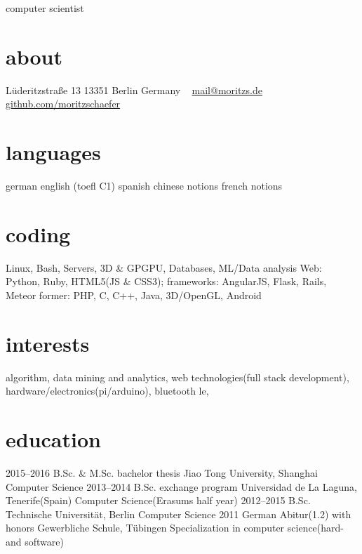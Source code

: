 \documentclass[]{friggeri-cv}
\begin{document}
       {computer scientist}


\begin{aside}
  \section{about}
    Lüderitzstraße 13
    13351 Berlin
    Germany
    ~
    \href{mailto:mail@moritz.de}{mail@moritzs.de}
    \href{https://github.com/moritzschaefer}{github.com/moritzschaefer}
  \section{languages}
    german
    english (toefl C1)
    spanish
    chinese notions
    french notions
  \section{coding}
    Linux, Bash, Servers, 3D \& GPGPU, Databases, ML/Data analysis
    Web:
    Python, Ruby,
    HTML5(JS \& CSS3); frameworks: AngularJS, Flask, Rails, Meteor
    former:
    PHP, C, C++, Java, 3D/OpenGL, Android
\end{aside}

\section{interests}

algorithm, data mining and analytics,
web technologies(full stack development),
hardware/electronics(pi/arduino), bluetooth le,

\section{education}

\begin{entrylist}
  \entry
    {2015–2016}
    {B.Sc. \& M.Sc. bachelor thesis}
    {Jiao Tong University, Shanghai}
    {Computer Science}
  \entry
    {2013–2014}
    {B.Sc. exchange program}
    {Universidad de La Laguna, Tenerife(Spain)}
    {Computer Science(Erasums half year)}
  \entry
    {2012–2015}
    {B.Sc.}
    {Technische Universität, Berlin}
    {Computer Science}
  \entry
    {2011}
    {German Abitur(1.2) with honors}
    {Gewerbliche Schule, Tübingen}
    {Specialization in computer science(hard- and software)}
\end{entrylist}
\end{document}
